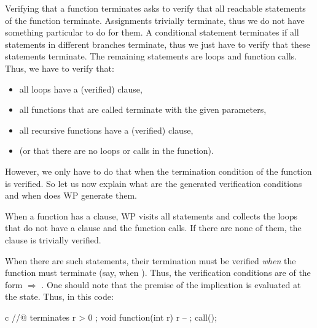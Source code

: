 


Verifying that a function terminates asks to verify that all reachable
statements of the function terminate. Assignments trivially terminate, thus
we do not have something particular to do for them. A conditional statement
terminates if all statements in different branches terminate, thus we just
have to verify that these statements terminate. The remaining statements are
loops and function calls. Thus, we have to verify that:



\begin{itemize}
  \item all loops have a (verified)  clause,
  \item all functions that are called terminate with the given parameters,
  \item all recursive functions have a (verified)  clause,
  \item (or that there are no loops or calls in the function).
\end{itemize}



However, we only have to do that when the termination condition of the function
is verified. So let us now explain what are the generated verification
conditions and when does WP generate them.



When a function has a  clause, WP visits all statements
and collects the loops that do not have a  clause and
the function calls. If there are none of them, the 
clause is trivially verified.






When there are such statements, their termination must be verified {\em when}
the function must terminate (say, when ). Thus, the verification
conditions are of the form
 $\Rightarrow$ .
One should note that the premise of the implication is evaluated at the
 state. Thus, in this code:



\begin{CodeBlock}{c}
//@ terminates r > 0 ;
void function(int r){
  r -- ;
  call();
}
\end{CodeBlock}



